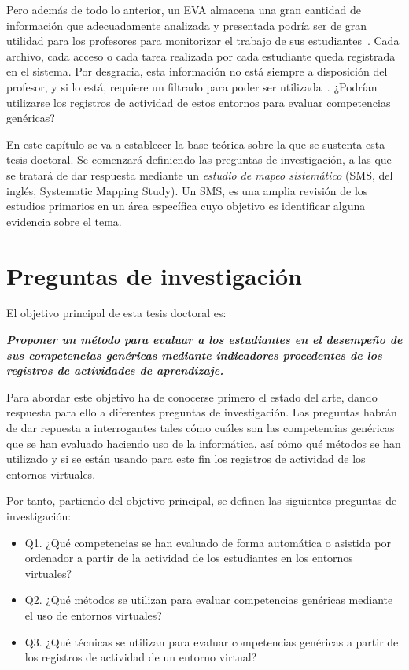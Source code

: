 Pero además de todo lo anterior, un EVA almacena una gran cantidad de información que adecuadamente analizada y presentada podría ser de gran utilidad para los profesores para monitorizar el trabajo de sus estudiantes~\cite{podgorelec:2011}. Cada archivo, cada acceso o cada tarea realizada por cada estudiante queda registrada en el sistema. Por desgracia, esta información no está siempre a disposición del profesor, y si lo está, requiere un filtrado para poder ser utilizada~\cite{Chebil:2012}. ¿Podrían utilizarse los registros de actividad de estos entornos para evaluar competencias genéricas?

En este capítulo se va a establecer la base teórica sobre la que se sustenta esta tesis doctoral. Se comenzará definiendo las preguntas de investigación, a las que se tratará de dar respuesta mediante un \emph{estudio de mapeo sistemático} (SMS, del inglés, Systematic Mapping Study). Un SMS, es una amplia revisión de los estudios primarios en un área específica cuyo objetivo es identificar alguna evidencia sobre el tema.

\section{Preguntas de investigación}

El objetivo principal de esta tesis doctoral es:

\bigskip
\textbf{\emph{Proponer un método para evaluar a los estudiantes en el desempeño de sus competencias genéricas mediante indicadores procedentes de los registros de actividades de aprendizaje.}}
\bigskip

Para abordar este objetivo ha de conocerse primero el estado del arte, dando respuesta para ello a diferentes preguntas de investigación. Las preguntas habrán de dar repuesta a interrogantes tales cómo cuáles son las competencias genéricas que se han evaluado haciendo uso de la informática, así cómo qué métodos se han utilizado y si se están usando para este fin los registros de actividad de los entornos virtuales.

\bigskip
Por tanto, partiendo del objetivo principal, se definen las siguientes preguntas de investigación:
\begin{itemize}
\item Q1. ¿Qué competencias se han evaluado de forma automática o asistida por ordenador a partir de la actividad de los estudiantes en los entornos virtuales?
\item Q2. ¿Qué métodos se utilizan para evaluar competencias genéricas mediante el uso de entornos virtuales?
\item Q3. ¿Qué técnicas se utilizan para evaluar competencias genéricas a partir de los registros de actividad de un entorno virtual?
\end{itemize}

